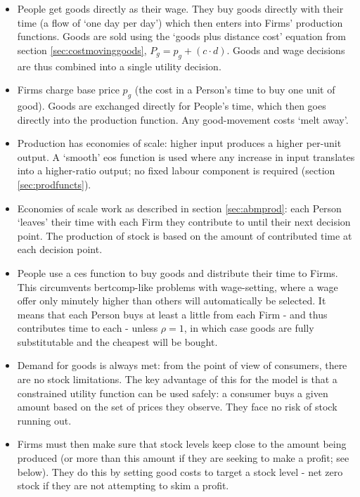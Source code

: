 \begin{itemize}
\item People get goods directly as their wage. They buy goods directly with their time (a flow of `one day per day') which then enters into Firms' production functions. Goods are sold using the `goods plus distance cost' equation from section \ref{sec:costmovinggoods}, $P_g = p_g + (c \cdot d)$. Goods and wage decisions are thus combined into a single utility decision.
\item Firms charge base price $p_g$ (the cost in a Person's time to buy one unit of good). Goods are exchanged directly for People's time, which then goes directly into the production function. Any good-movement costs `melt away'.
\item Production has economies of scale: higher input produces a higher per-unit output. A `smooth' \gls{eos} function is used where any increase in input translates into a higher-ratio output; no fixed labour component is required (section \ref{sec:prodfuncts}). 
	\item Economies of scale work as described in section \ref{sec:abmprod}: each Person `leaves' their time with each Firm they contribute to until their next decision point. The production of stock is based on the amount of contributed time at each decision point.
\item People use a \gls{ces} function to buy goods and distribute their time to Firms. This circumvents \gls{bertcomp}-like problems with wage-setting, where a wage offer only minutely higher than others will automatically be selected. It means that each Person buys at least a little from each Firm - and thus contributes time to each - unless $\rho = 1$, in which case goods are fully substitutable and the cheapest will be bought.
	\item Demand for goods is always met: from the point of view of consumers, there are no stock limitations. The key advantage of this for the model is that a constrained utility function can be used safely: a consumer buys a given amount based on the set of prices they observe. They face no risk of stock running out.
	\item Firms must then make sure that stock levels keep close to the amount being produced (or more than this amount if they are seeking to make a profit; see below). They do this by setting good costs to target a stock level - net zero stock if they are not attempting to skim a profit.
\end{itemize}

